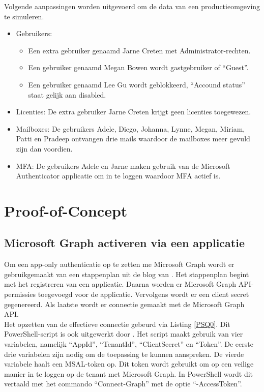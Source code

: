 Volgende aanpassingen worden uitgevoerd om de data van een productieomgeving te simuleren.

\begin{itemize}
    \item Gebruikers: 
    \begin{itemize}
        \item Een extra gebruiker genaamd Jarne Creten met Administrator-rechten.
        \item Een gebruiker genaamd Megan Bowen wordt gastgebruiker of “Guest”.
        \item Een gebruiker genaamd Lee Gu wordt geblokkeerd, “Accound status” staat gelijk aan disabled.
    \end{itemize}
    \item Licenties: De extra gebruiker Jarne Creten krijgt geen licenties toegewezen.
    \item Mailboxes: De gebruikers Adele, Diego, Johanna, Lynne, Megan, Miriam, Patti en Pradeep ontvangen drie mails waardoor de mailboxes meer gevuld zijn dan voordien.
    \item \ac{MFA}: De gebruikers Adele en Jarne maken gebruik van de Microsoft Authenticator applicatie om in te loggen waardoor \ac{MFA} actief is.
\end{itemize}

\section{Proof-of-Concept}

\subsection{Microsoft Graph activeren via een applicatie}

Om een app-only authenticatie op te zetten me Microsoft Graph wordt er gebruikgemaakt van een stappenplan uit de blog van \textcite{Terlisten2022}. Het stappenplan begint met het registreren van een applicatie. Daarna worden er Microsoft Graph \Ac{API}-permissies toegevoegd voor de applicatie. Vervolgens wordt er een client secret gegenereerd. Als laatste wordt er connectie gemaakt met de Microsoft Graph \Ac{API}. \\

Het opzetten van de effectieve connectie gebeurd via Listing \ref{PSQ0}. Dit PowerShell-script is ook uitgewerkt door \textcite{Terlisten2022}. Het script maakt gebruik van vier variabelen, namelijk “AppId”, “TenantId”, “ClientSecret” en “Token”. De eerste drie variabelen zijn nodig om de toepassing te kunnen aanspreken. De vierde variabele haalt een \ac{MSAL}-token op. Dit token wordt gebruikt om op een veilige manier in te loggen op de tenant met Microsoft Graph. In PowerShell wordt dit vertaald met het commando “Connect-Graph” met de optie “-AccessToken”. \\

